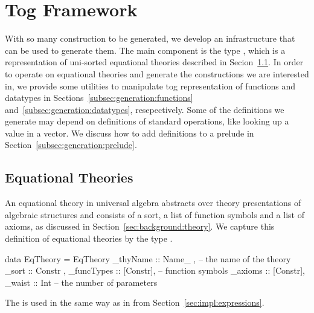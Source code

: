 \section{Tog Framework}
\label{sec:togFamework}
With so many construction to be generated, we develop an infrastructure that can be used to generate them. The main component is the type , which is a representation of uni-sorted equational theories described in Secion~\ref{subsec:generation:eqTheories}. 
In order to operate on equational theories and generate the constructions we are interested in, we provide some utilities to manipulate tog representation of functions and datatypes in Sections~\ref{subsec:generation:functions} and~\ref{subsec:generation:datatypes}, resepectively. 
Some of the definitions we generate may depend on definitions of standard operations, like looking up a value in a vector. We discuss how to add definitions to a prelude in Section~\ref{subsec:generation:prelude}. 


\subsection{Equational Theories}
\label{subsec:generation:eqTheories}
An equational theory in universal algebra abstracts over theory presentations of algebraic structures and consists of a sort, a list of function symbols and a list of axioms, as discussed in Section~\ref{sec:background:theory}. We capture this definition of equational theories by the type . 
\begin{hscode}
data EqTheory = EqTheory {
  _thyName    :: Name_  ,   -- the name of the theory 
  _sort       :: Constr ,      
  _funcTypes  :: [Constr], -- function symbols 
  _axioms     :: [Constr],
  _waist      :: Int }     -- the number of parameters 
\end{hscode}
The  is used in the same way as in  from Section~\ref{sec:impl:expressions}. 

